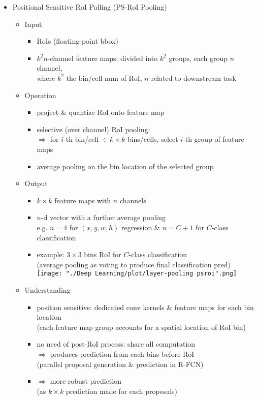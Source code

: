 \begin{itemize}
\item Positional Sensitive RoI Polling (PS-RoI Pooling) \label{DL_Layers_Pooling_psroi}
	\begin{itemize}
	\item Input
		\begin{itemize}
		\item RoIs (floating-point bbox)
		\item $k^2n$-channel feature maps: divided into $k^2$ groups, each group $n$ channel, \\
		where $k^2$ the bin/cell num of RoI, $n$ related to downstream task
		\end{itemize}
	\item Operation
		\begin{itemize}
		\item project \& quantize RoI onto feature map
		\item selective (over channel) RoI pooling: \\
		$\Rightarrow$ for $i$-th bin/cell $\in k\times k$ bins/cells, select $i$-th group of feature maps
		\item average pooling on the bin location of the selected group
		\end{itemize}
	\item Output
		\begin{itemize}
		\item $k\times k$ feature maps with $n$ channels
		\item $n$-d vector with a further average pooling \\
		e.g. $n = 4$ for $(x,y,w,h)$ regression \& $n=C+1$ for $C$-class classification
		\item example: $3\times 3$ bins RoI for $C$-class classification \\
		(average pooling as voting to produce final classification pred) \\
		\texttt{[image: "./Deep Learning/plot/layer-pooling psroi".png]}	
		\end{itemize}
	\item Understanding
		\begin{itemize}
		\item position sensitive: dedicated conv kernels \& feature maps for each bin location \\
		(each feature map group accounts for a spatial location of RoI bin)
		\item no need of post-RoI process: share all computation \\
		$\Rightarrow$ produces prediction from each bins before RoI \\
		(parallel proposal generation \& prediction in R-FCN)
		\item $\Rightarrow$ more robust prediction \\ 
		(as $k\times k$ prediction made for each proposals)
		\end{itemize}
	\end{itemize}


\end{itemize}
